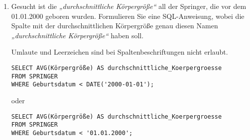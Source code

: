 \documentclass{bschlangaul-aufgabe}
\begin{document}
\begin{enumerate}
%

\item Gesucht ist die \emph{„durchschnittliche Körpergröße“} all der
Springer, die vor dem 01.01.2000 geboren wurden. Formulieren Sie eine
SQL-Anweisung, wobei die Spalte mit der durchschnittlichen Körpergröße
genau diesen Namen \emph{„durchschnittliche Körpergröße“} haben soll.

\begin{liAntwort}
Umlaute und Leerzeichen sind bei Spaltenbeschriftungen nicht erlaubt.

\begin{verbatim}
SELECT AVG(Körpergröße) AS durchschnittliche_Koerpergroesse
FROM SPRINGER
WHERE Geburtsdatum < DATE('2000-01-01');
\end{verbatim}
\end{liAntwort}

oder

\begin{liAntwort}
\begin{verbatim}
SELECT AVG(Körpergröße) AS durchschnittliche_Koerpergroesse
FROM SPRINGER
WHERE Geburtsdatum < '01.01.2000';
\end{verbatim}
\end{liAntwort}

\end{enumerate}
\end{document}
